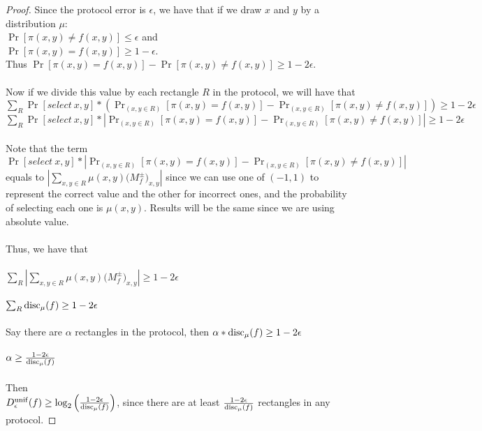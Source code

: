 \begin{proof}
	Since the protocol error is $\epsilon$, we have that if we draw  $x$ and $y$ by a distribution $\mu$: \\
	$\Pr[ \pi(x,y) \neq f(x,y)] \le \epsilon$ and\\
	$\Pr[ \pi(x,y) = f(x,y)] \ge 1-\epsilon$. \\
	Thus $\Pr[ \pi(x,y) = f(x,y)] - \Pr[ \pi(x,y) \neq f(x,y)] \ge 1-2\epsilon$. \\
	\\
	Now if we divide this value by each rectangle $R$ in the protocol, we will have that \\
	$\sum_{R} \Pr[select\ x,y] * (\Pr_{(x,y \in R)}[ \pi(x,y) = f(x,y)] - \Pr_{(x,y \in R)}[ \pi(x,y) \neq f(x,y)]) \ge 1-2\epsilon$ \\
	$\sum_{R} \Pr[select\ x,y] * |\Pr_{(x,y \in R)}[ \pi(x,y) = f(x,y)] - \Pr_{(x,y \in R)}[ \pi(x,y) \neq f(x,y)]| \ge 1-2\epsilon$ \\
	\\
	Note that the term  $\Pr[select\ x,y] * |\Pr_{(x,y \in R)}[ \pi(x,y) = f(x,y)] - \Pr_{(x,y \in R)}[ \pi(x,y) \neq f(x,y)]|$ equals to ${\left| \sum_{x,y \in R} \mu(x,y)\big(M^{\pm}_f\big)_{x,y} \right|}$ since we can use one of $(-1,1)$ to represent the correct value and the other for incorrect ones, and the probability of selecting each one is $\mu(x,y)$. Results will be the same since we are using absolute value. \\
	\\
	Thus, we have that \\
	\\
	$\sum_{R} {\left| \sum_{x,y \in R} \mu(x,y)\big(M^{\pm}_f\big)_{x,y} \right|} \ge 1-2\epsilon$\\
	\\
	$\sum_{R} \mathrm{disc}_\mu(f) \ge 1-2\epsilon$\\
	\\
	Say there are $\alpha$ rectangles in the protocol, then
	$\alpha * \mathrm{disc}_\mu(f) \ge 1-2\epsilon$ \\ 
	\\
	$\alpha \ge \frac{1-2\epsilon}{\mathrm{disc}_\mu(f)}$ \\
	\\
	Then\\
	$D_\epsilon^{\mathrm{unif}}(f) \ge \log_2 \left( \frac{1-2\epsilon}{\mathrm{disc}_\mu(f)} \right)$, since there are at least $\frac{1-2\epsilon}{\mathrm{disc}_\mu(f)}$ rectangles in any protocol.
\end{proof}


